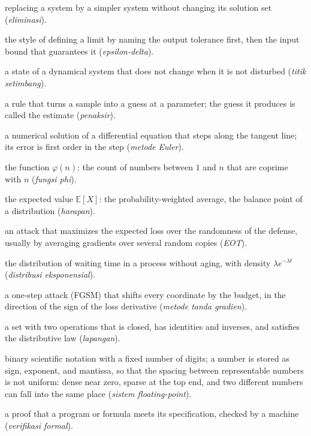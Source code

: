 \begin{description}[style=nextline,itemsep=0.35em]
  \item[Elimination] replacing a system by a simpler system without changing its solution set (\emph{eliminasi}).
  \item[Epsilon-delta definition] the style of defining a limit by naming the output tolerance first, then the input bound that guarantees it (\emph{epsilon-delta}).
  \item[Equilibrium point] a state of a dynamical system that does not change when it is not disturbed (\emph{titik setimbang}).
  \item[Estimator] a rule that turns a sample into a guess at a parameter; the guess it produces is called the estimate (\emph{penaksir}).
  \item[Euler method] a numerical solution of a differential equation that steps along the tangent line; its error is first order in the step (\emph{metode Euler}).
  \item[Euler totient function] the function $\varphi(n)$: the count of numbers between $1$ and $n$ that are coprime with $n$ (\emph{fungsi phi}).
  \item[Expectation] the expected value $\mathbb{E}[X]$: the probability-weighted average, the balance point of a distribution (\emph{harapan}).
  \item[Expectation over transformation] an attack that maximizes the expected loss over the randomness of the defense, usually by averaging gradients over several random copies (\emph{EOT}).
  \item[Exponential distribution] the distribution of waiting time in a process without aging, with density $\lambda e^{-\lambda t}$ (\emph{distribusi eksponensial}).
  \item[Fast gradient sign method] a one-step attack (FGSM) that shifts every coordinate by the budget, in the direction of the sign of the loss derivative (\emph{metode tanda gradien}).
  \item[Field] a set with two operations that is closed, has identities and inverses, and satisfies the distributive law (\emph{lapangan}).
  \item[Floating-point system] binary scientific notation with a fixed number of digits; a number is stored as sign, exponent, and mantissa, so that the spacing between representable numbers is not uniform: dense near zero, sparse at the top end, and two different numbers can fall into the same place (\emph{sistem floating-point}).
  \item[Formal verification] a proof that a program or formula meets its specification, checked by a machine (\emph{verifikasi formal}).

\end{description}
